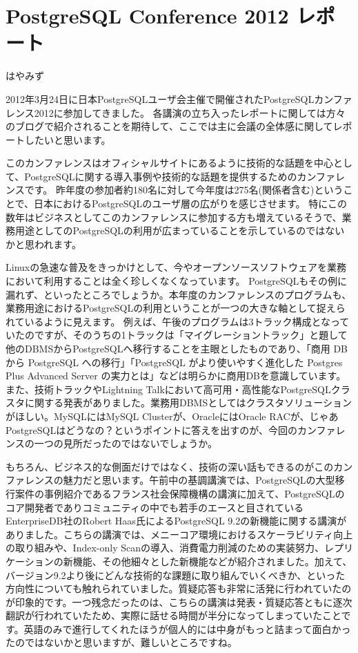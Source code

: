 \chapter{PostgreSQL Conference 2012 レポート}

\begin{flushright}
 はやみず
\end{flushright}

2012年3月24日に日本PostgreSQLユーザ会主催で開催されたPostgreSQLカンファレンス2012に参加してきました。 各講演の立ち入ったレポートに関しては方々のブログで紹介されることを期待して、ここでは主に会議の全体感に関してレポートしたいと思います。

このカンファレンスはオフィシャルサイトにあるように技術的な話題を中心として、PostgreSQLに関する導入事例や技術的な話題を提供するためのカンファレンスです。 昨年度の参加者約180名に対して今年度は275名(関係者含む)ということで、日本におけるPostgreSQLのユーザ層の広がりを感じさせます。 特にこの数年はビジネスとしてこのカンファレンスに参加する方も増えているそうで、業務用途としてのPostgreSQLの利用が広まっていることを示しているのではないかと思われます。

Linuxの急速な普及をきっかけとして、今やオープンソースソフトウェアを業務において利用することは全く珍しくなくなっています。 PostgreSQLもその例に漏れず、といったところでしょうか。本年度のカンファレンスのプログラムも、業務用途におけるPostgreSQLの利用ということが一つの大きな軸として捉えられているように見えます。 例えば、午後のプログラムは3トラック構成となっていたのですが、そのうちの1トラックは「マイグレーショントラック」と題して他のDBMSからPostgreSQLへ移行することを主眼としたものであり、「商用 DB から PostgreSQL への移行」「PostgreSQL がより使いやすく進化した Postgres Plus Advanced Server の実力とは」などは明らかに商用DBを意識しています。また、技術トラックやLightning Talkにおいて高可用・高性能なPostgreSQLクラスタに関する発表がありました。業務用DBMSとしてはクラスタソリューションがほしい。MySQLにはMySQL Clusterが、OracleにはOracle RACが、じゃあPostgreSQLはどうなの？というポイントに答えを出すのが、今回のカンファレンスの一つの見所だったのではないでしょうか。

もちろん、ビジネス的な側面だけではなく、技術の深い話もできるのがこのカンファレンスの魅力だと思います。午前中の基調講演では、PostgreSQLの大型移行案件の事例紹介であるフランス社会保障機構の講演に加えて、PostgreSQLのコア開発者でありコミュニティの中でも若手のエースと目されているEnterpriseDB社のRobert Haas氏によるPostgreSQL 9.2の新機能に関する講演がありました。こちらの講演では、メニーコア環境におけるスケーラビリティ向上の取り組みや、Index-only Scanの導入、消費電力削減のための実装努力、レプリケーションの新機能、その他細々とした新機能などが紹介されました。加えて、バージョン9.2より後にどんな技術的な課題に取り組んでいくべきか、といった方向性についても触れられていました。質疑応答も非常に活発に行われていたのが印象的です。一つ残念だったのは、こちらの講演は発表・質疑応答ともに逐次翻訳が行われていたため、実際に話せる時間が半分になってしまっていたことです。英語のみで進行してくれたほうが個人的には中身がもっと詰まって面白かったのではないかと思いますが、難しいところですね。

